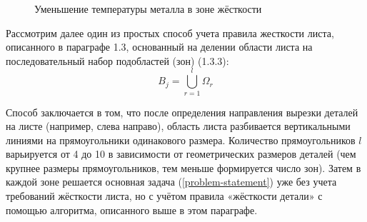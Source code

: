 \documentclass[12pt,twoside]{report}
\newcounter{lem}
\begin{document}
\begin{figure}
  \centering
  \caption{Уменьшение температуры металла в зоне жёсткости }
  \label{thermal-550-130}
\end{figure}



Рассмотрим далее один из простых способ учета правила жесткости листа,
описанного в параграфе 1.3,
основанный на делении области листа на
последовательный набор подобластей (зон) (1.3.3):
$$
B_j =
\bigcup_{r=1}^l \Omega_r
$$

Способ заключается в том,
что после определения направления вырезки деталей на листе
(например, слева направо),
область листа разбивается вертикальными линиями
на прямоугольники одинакового размера.
Количество прямоугольников $l$
варьируется от 4 до 10 в зависимости от
геометрических размеров деталей
(чем крупнее размеры прямоугольников,
тем меньше формируется число зон).
Затем в каждой зоне решается основная задача (\ref{problem-statement})
уже без учета требований жёсткости листа,
но с учётом правила «жёсткости детали»
с помощью  алгоритма, описанного выше в этом параграфе.
\end{document}
